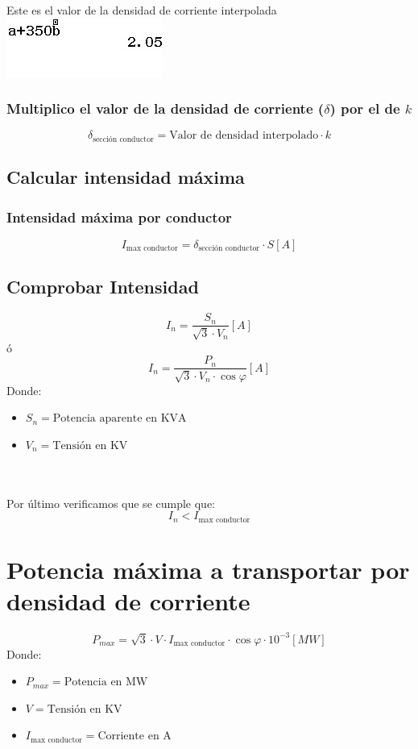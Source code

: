 \documentclass[10pt,a4paper]{article}
\begin{document}
Este es el valor de la densidad de corriente interpolada
\\

\includegraphics[]{src/07.jpg}\\

\subsubsection{Multiplico el valor de la densidad de corriente ($\delta$) por el de $k$}
$$
\delta_{\text{sección conductor}} = \text{Valor de densidad interpolado} \cdot k
$$
\subsection{Calcular intensidad máxima}
\subsubsection{Intensidad máxima por conductor}
$$
I_{\text{max conductor}} = \delta_{\text{sección conductor}} \cdot S [A]
$$

\subsection{Comprobar Intensidad}
$$
I_{n} = \frac{S_n}{\sqrt{3}\cdot V_n} [A]
$$
ó
$$
I_{n} = \frac{P_n}{\sqrt{3}\cdot V_n\cdot \cos \varphi} [A]
$$
Donde:
\begin{itemize}
    \item $S_n = \text{Potencia aparente en KVA}$
    \item $V_n = \text{Tensión en KV}$
\end{itemize}
\\
\vspace{1cm}
\\

Por último verificamos que se cumple que:
$$
I_n < I_{\text{max conductor}}
$$
\section{Potencia máxima a transportar por densidad de corriente}
$$
P_{max} = \sqrt{3} \cdot V \cdot I_{\text{max conductor}} \cdot \cos{\varphi} \cdot 10^{-3} [MW]
$$
Donde:
\begin{itemize}
    \item $P_{max} = \text{Potencia en MW}$
    \item $V = \text{Tensión en KV}$
    \item $I_{\text{max conductor}} = \text{Corriente en A}$ 
\end{itemize}
\end{document}
